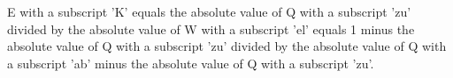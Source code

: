 E with a subscript 'K' equals the absolute value of Q with a subscript 'zu' divided by the absolute value of W with a subscript 'el' equals 1 minus the absolute value of Q with a subscript 'zu' divided by the absolute value of Q with a subscript 'ab' minus the absolute value of Q with a subscript 'zu'.